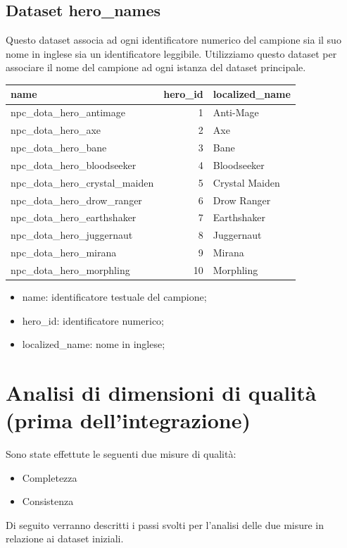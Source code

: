 \documentclass[a4paper,12pt,openany,oneside]{book}
\begin{document}
\subsection{Dataset hero\_names}
Questo dataset associa ad ogni identificatore numerico del campione sia il suo nome in inglese sia un identificatore leggibile. Utilizziamo questo dataset per associare il nome del campione ad ogni istanza del dataset principale.
\begin{table}[ht]
	\scriptsize	
	\centering	
	\begin{tabularx}{0.5\textwidth}{lrl}
        name & hero\_id & localized\_name \\
        \midrule
        npc\_dota\_hero\_antimage &       1 &      Anti-Mage \\
        npc\_dota\_hero\_axe &       2 &            Axe \\
        npc\_dota\_hero\_bane &       3 &           Bane \\
        npc\_dota\_hero\_bloodseeker &       4 &    Bloodseeker \\
        npc\_dota\_hero\_crystal\_maiden &       5 & Crystal Maiden \\
        npc\_dota\_hero\_drow\_ranger &       6 &    Drow Ranger \\
        npc\_dota\_hero\_earthshaker &       7 &    Earthshaker \\
        npc\_dota\_hero\_juggernaut &       8 &     Juggernaut \\
        npc\_dota\_hero\_mirana &       9 &         Mirana \\
        npc\_dota\_hero\_morphling &      10 &      Morphling \\
	\end{tabularx}
\end{table}
\begin{itemize}
	\item name: identificatore testuale del campione;
	\item hero\_id: identificatore numerico;
	\item localized\_name: nome in inglese;
\end{itemize}

\section{Analisi di dimensioni di qualità (prima dell'integrazione)}
Sono state effettute le seguenti due misure di qualità:
\begin{itemize}
	\item Completezza
	\item Consistenza
\end{itemize}
Di seguito verranno descritti i passi svolti per l'analisi delle due misure in relazione ai dataset iniziali.
\end{document}
